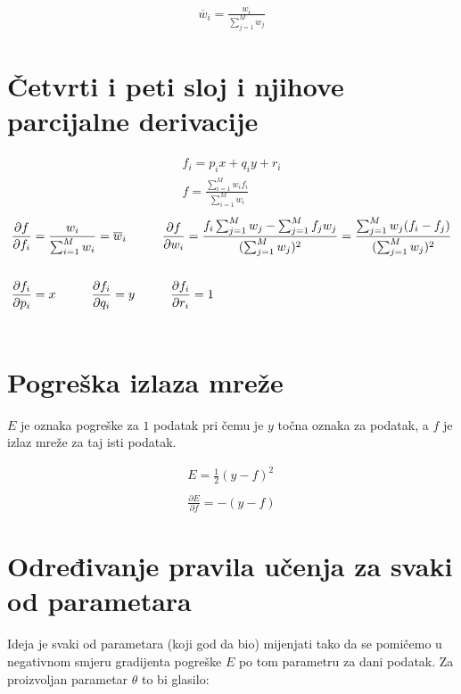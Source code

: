 \documentclass{article}
\begin{document}
\begin{align*}
	\overline{w}_i = \frac{w_i}{\sum_{j=1}^{M} w_j}
\end{align*}

\section{Četvrti i peti sloj i njihove parcijalne derivacije}
\begin{align*}
  f_{i} = p_{i} x + q_{i} y + r_{i} \\
  f = \frac{\sum_{i=1}^{M} w_{i}f_{i}}{\sum_{i=1}^{M} w_i}
\end{align*}
\begin{align*}
  &\frac{\partial f}{\partial f_i} = \frac{w_{i}}{\sum_{i=1}^{M} w_{i}} = \overline{w}_i \hspace{5mm} \hspace{5mm} \frac{\partial f}{\partial w_i} = \frac{f_{i} \sum_{j=1}^{M} w_{j} - \sum_{j=1}^{M} f_{j}w_{j}}{(\sum_{j=1}^{M} w_{j})^2} = \frac{\sum_{j=1}^{M} w_{j}(f_{i} - f_{j})}{(\sum_{j=1}^{M} w_{j})^2} \\ \\
  &\frac{\partial f_{i}}{\partial p_{i}} = x \hspace{1cm}
  \frac{\partial f_{i}}{\partial q_{i}} = y \hspace{1cm}
  \frac{\partial f_{i}}{\partial r_{i}} = 1 \\ \\
\end{align*}

\section{Pogreška izlaza mreže}
$E$ je oznaka pogreške za $1$ podatak pri čemu je $y$ točna oznaka za podatak, a $f$ je izlaz mreže za taj isti podatak.

\begin{align*}
	E = \frac{1}{2}(y - f)^2 \\ \\
	\frac{\partial E}{\partial f} = -(y - f)
\end{align*}

\section{Određivanje pravila učenja za svaki od parametara}
Ideja je svaki od parametara (koji god da bio) mijenjati tako da se pomičemo u negativnom smjeru gradijenta pogreške $E$ po tom parametru za dani podatak. Za proizvoljan parametar $\theta$ to bi glasilo:
\end{document}
